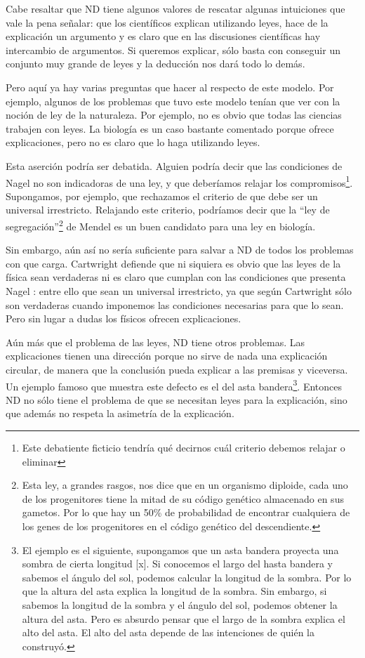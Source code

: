 Cabe resaltar que ND tiene algunos valores de rescatar algunas intuiciones que vale la pena señalar: que los científicos explican utilizando leyes, hace de la explicación un argumento y es claro que en las discusiones científicas hay intercambio de argumentos. Si queremos explicar, sólo basta con conseguir un conjunto muy grande de leyes y la deducción nos dará todo lo demás.

Pero aquí ya hay varias preguntas que hacer al respecto de este modelo. Por ejemplo, algunos de los problemas que tuvo este modelo tenían que ver con la noción de ley de la naturaleza. Por ejemplo, no es obvio que todas las ciencias trabajen con leyes. La biología es un caso bastante comentado porque ofrece explicaciones, pero no es claro que lo haga utilizando leyes.

Esta aserción podría ser debatida. Alguien podría decir que las condiciones de Nagel no son indicadoras de una ley, y que deberíamos relajar los compromisos\footnote{Este debatiente ficticio tendría qué decirnos cuál criterio debemos relajar o eliminar}. Supongamos, por ejemplo, que rechazamos el criterio de que debe ser un universal irrestricto. Relajando este criterio, podríamos decir que la ``ley de segregación''\footnote{Esta ley, a grandes rasgos, nos dice que en un organismo diploide, cada uno de los progenitores tiene la mitad de su código genético almacenado en sus gametos. Por lo que hay un 50\% de probabilidad de encontrar cualquiera de los genes de los progenitores en el código genético del descendiente.} de Mendel es un buen candidato para una ley en biología.

Sin embargo, aún así no sería suficiente para salvar a ND de todos los problemas con que carga. Cartwright defiende que ni siquiera es obvio que las leyes de la física sean verdaderas ni es claro que cumplan con las condiciones que presenta Nagel \cite{Cartwright1983}: entre ello que sean un universal irrestricto, ya que según Cartwright sólo son verdaderas cuando imponemos las condiciones necesarias para que lo sean. Pero sin lugar a dudas los físicos ofrecen explicaciones.

Aún más que el problema de las leyes, ND tiene otros problemas. Las explicaciones tienen una dirección porque no sirve de nada una explicación circular, de manera que la conclusión pueda explicar a las premisas y viceversa. Un ejemplo famoso que muestra este defecto es el del asta bandera\footnote{El ejemplo es el siguiente, supongamos que un asta bandera proyecta una sombra de cierta longitud [x]. Si conocemos el largo del hasta bandera y sabemos el ángulo del sol, podemos calcular la longitud de la sombra. Por lo que la altura del asta explica la longitud de la sombra. Sin embargo, si sabemos la longitud de la sombra y el ángulo del sol, podemos obtener la altura del asta. Pero es absurdo pensar que el largo de la sombra explica el alto del asta. El alto del asta depende de las intenciones de quién la construyó.}. Entonces ND no sólo tiene el problema de que se necesitan leyes para la explicación, sino que además no respeta la asimetría de la explicación.


